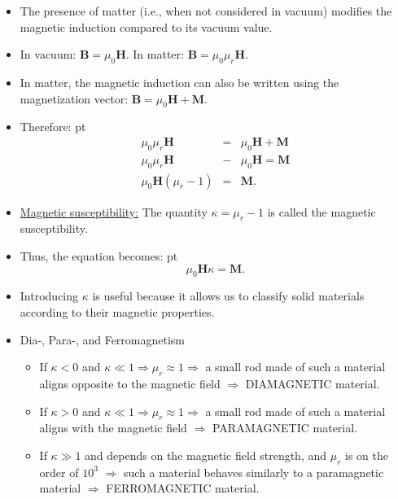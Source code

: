 \documentclass[t,aspectratio=169,xcolor=dvipsnames]{beamer}
\begin{document}
\begin{frame}
\begin{itemize}
\pagebreak
\item The presence of matter (i.e., when not considered in vacuum) modifies the magnetic induction compared to its vacuum value.
\item In vacuum: $\mathbf{B} = \mu_{0} \mathbf{H}$. In matter: $\mathbf{B} = \mu_{0} \mu_{r} \mathbf{H}$.
\item In matter, the magnetic induction can also be written using the magnetization vector: $\mathbf{B} = \mu_{0}\mathbf{H} + \mathbf{M}$.
\item Therefore: { pt}
\begin{eqnarray*}
  \mu_{0}\mu_{r}\mathbf{H} &=& \mu_{0}\mathbf{H} + \mathbf{M}\\
  \mu_{0}\mu_{r}\mathbf{H} &-& \mu_{0}\mathbf{H} = \mathbf{M}\\
 \mu_{0}\mathbf{H}(\mu_{r}-1) &=& \mathbf{M}. 
\end{eqnarray*}
\item \underline{Magnetic susceptibility:} The quantity $\kappa = \mu_{r} - 1$ is called the magnetic susceptibility.
\item Thus, the equation becomes: { pt} $$\mu_{0}\mathbf{H}\kappa = \mathbf{M}.$$

\pagebreak
\item Introducing $\kappa$ is useful because it allows us to classify solid materials according to their magnetic properties.
\item Dia-, Para-, and Ferromagnetism
\begin{itemize}
\setlength{\parskip}{0pt}
\setlength{\itemsep}{0pt}
\item If $\kappa < 0$ and $\kappa \ll 1 \Rightarrow \mu_{r} \approx 1 \Rightarrow$ a small rod made of such a material aligns opposite to the magnetic field $\Rightarrow$ DIAMAGNETIC material.
\item If $\kappa > 0$ and $\kappa \ll 1 \Rightarrow \mu_{r} \approx 1 \Rightarrow$ a small rod made of such a material aligns with the magnetic field $\Rightarrow$ PARAMAGNETIC material.
\item If $\kappa \gg 1$ and depends on the magnetic field strength, and $\mu_{r}$ is on the order of $10^{3}$ $\Rightarrow$ such a material behaves similarly to a paramagnetic material $\Rightarrow$ FERROMAGNETIC material.
\end{itemize}


\end{itemize}
\end{frame}
\end{document}

